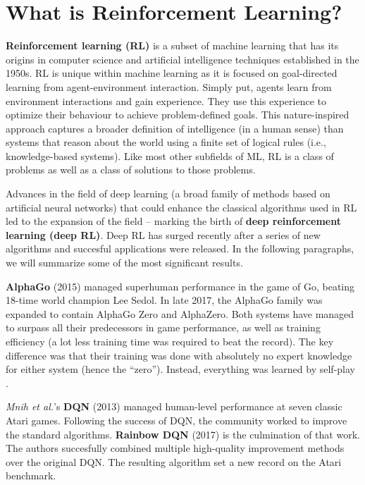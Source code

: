 \section{What is Reinforcement Learning?}

\textbf{Reinforcement learning (RL)} is a subset of machine learning that has its origins in computer science and artificial intelligence techniques established in the 1950s.
RL is unique within machine learning as it is focused on goal-directed learning from agent-environment interaction\cite{rlai}.
Simply put, agents learn from environment interactions and gain experience.
They use this experience to optimize their behaviour to achieve problem-defined goals.
This nature-inspired approach captures a broader definition of intelligence (in a human sense) than systems that reason about the world using a finite set of logical rules (i.e., knowledge-based systems).
Like most other subfields of ML, RL is a class of problems as well as a class of solutions to those problems\cite{rlai}.

Advances in the field of deep learning (a broad family of methods based on artificial neural networks\cite{wiki:Deep_learning}) that could enhance the classical algorithms used in RL led to the expansion of the field -- marking the birth of \textbf{deep reinforcement learning (deep RL)}.
Deep RL has surged recently after a series of new algorithms and succesful applications were released. In the following paragraphs, we will summarize some of the most significant results.

\textbf{AlphaGo} (2015)\cite{ago} managed superhuman performance in the game of Go, beating 18-time world champion Lee Sedol.
In late 2017, the AlphaGo family was expanded to contain AlphaGo Zero and AlphaZero\cite{azero}.
Both systems have managed to surpass all their predecessors in game performance, as well as training efficiency \cite{wiki:AlphaGo} (a lot less training time was required to beat the record).
The key difference was that their training was done with absolutely no expert knowledge for either system (hence the ``zero'').
Instead, everything was learned by self-play \cite{azero}.

\textit{Mnih et al.}'s \textbf{DQN} (2013)\cite{atari-dqn} managed human-level performance at seven classic Atari games.
Following the success of DQN, the community worked to improve the standard algorithms.
\textbf{Rainbow DQN} (2017)\cite{rainbow-dqn} is the culmination of that work.
The authors succesfully combined multiple high-quality improvement methods over the original DQN.
The resulting algorithm set a new record on the Atari benchmark.

